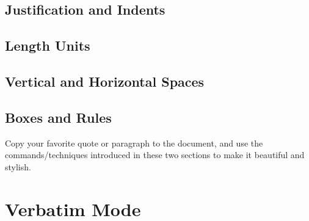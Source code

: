 \subsection{Justification and Indents}

\subsection{Length Units}

\subsection{Vertical and Horizontal Spaces}

\subsection{Boxes and Rules}

\begin{exercisebox}
\begin{Exercise}
Copy your favorite quote or paragraph to the document, and use the commands/techniques introduced in these two sections to make it beautiful and stylish.    
\end{Exercise}
\end{exercisebox}

\section{Verbatim Mode}